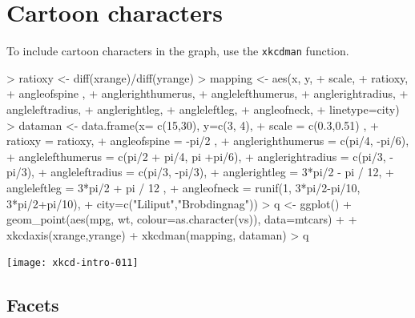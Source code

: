 \documentclass[10pt]{article}
\begin{document}
\section{Cartoon characters}

To include cartoon characters in the graph, use the \texttt{xkcdman} function.

\begin{center}
\begin{Schunk}
\begin{Sinput}
> ratioxy <- diff(xrange)/diff(yrange)
> mapping <- aes(x,  y,
+                scale,
+                ratioxy,
+                angleofspine ,
+                anglerighthumerus,
+                anglelefthumerus,
+                anglerightradius,
+                angleleftradius,
+                anglerightleg,
+                angleleftleg,
+                angleofneck,
+                linetype=city)
> dataman <- data.frame(x= c(15,30), y=c(3, 4),
+                       scale = c(0.3,0.51) ,
+                       ratioxy = ratioxy,
+                       angleofspine =  -pi/2  ,
+                       anglerighthumerus = c(pi/4, -pi/6),
+                       anglelefthumerus = c(pi/2 + pi/4, pi +pi/6),
+                       anglerightradius = c(pi/3, -pi/3),
+                       angleleftradius = c(pi/3, -pi/3),
+                       anglerightleg = 3*pi/2  - pi / 12,
+                       angleleftleg = 3*pi/2  + pi / 12 ,
+                       angleofneck = runif(1, 3*pi/2-pi/10, 3*pi/2+pi/10),
+                       city=c("Liliput","Brobdingnag"))
> q <- ggplot() + geom_point(aes(mpg, wt, colour=as.character(vs)), data=mtcars) + 
+   xkcdaxis(xrange,yrange) + xkcdman(mapping, dataman)
> q
\end{Sinput}
\end{Schunk}
\texttt{[image: xkcd-intro-011]}
\end{center}

\subsection{Facets}
\end{document}
